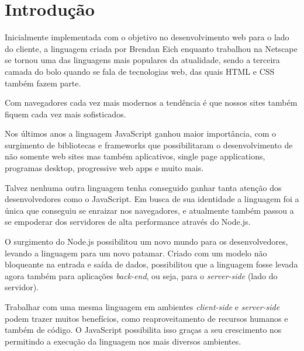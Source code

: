 \documentclass[
	12pt,				%
	openright,			%
	twoside,			%
	a4paper,			%
	english,			%
	brazil				%
	]{abntex2}
\begin{document}

\chapter{Introdução}

Inicialmente implementada com o objetivo no desenvolvimento web para o lado do cliente, a linguagem criada por Brendan Eich enquanto trabalhou na Netscape se tornou uma das linguagens mais populares da atualidade, sendo a terceira camada do bolo quando se fala de tecnologias web, das quais HTML e CSS também fazem parte. 

Com navegadores cada vez mais modernos a tendência é que nossos sites também fiquem cada vez mais sofisticados.

Nos últimos anos a linguagem JavaScript ganhou maior importância, com o surgimento de bibliotecas e frameworks que possibilitaram o desenvolvimento de não somente web sites mas também aplicativos, single page applications, programas desktop, progressive web apps e muito mais.

Talvez nenhuma outra linguagem tenha conseguido ganhar tanta atenção dos desenvolvedores como o JavaScript. Em busca de  sua identidade a linguagem foi a única que conseguiu se enraizar nos navegadores, e atualmente também passou a se empoderar dos servidores de alta performance através do Node.js.

O surgimento do Node.js possibilitou um novo mundo para os desenvolvedores, levando a linguagem para um novo patamar. Criado com um modelo não bloqueante na entrada e saída de dados, possibilitou que a linguagem fosse levada agora também para aplicações \textit{back-end}, ou seja, para o \textit{server-side} (lado do servidor).

Trabalhar com uma mesma linguagem em ambientes \textit{client-side} e \textit{server-side} podem trazer muitos benefícios, como reaproveitamento de recursos humanos e também de código. O JavaScript possibilita isso graças a seu crescimento nos permitindo a execução da linguagem nos mais diversos ambientes.
\end{document}
